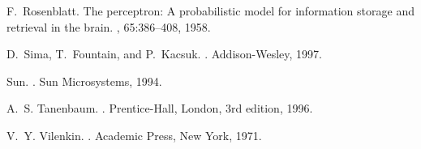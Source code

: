 \documentclass{elsart}
\begin{document}
\begin{thebibliography}{10}
F.~Rosenblatt.
\newblock The perceptron: A probabilistic model for information storage and
  retrieval in the brain.
, 65:386--408, 1958.

D.~Sima, T.~Fountain, and P.~Kacsuk.
.
\newblock Addison-Wesley, 1997.

Sun.
.
\newblock Sun Microsystems, 1994.

A.~S. Tanenbaum.
.
\newblock Prentice-Hall, London, 3rd edition, 1996.

V.~Y. Vilenkin.
.
\newblock Academic Press, New York, 1971.

\end{thebibliography}
\end{document}
